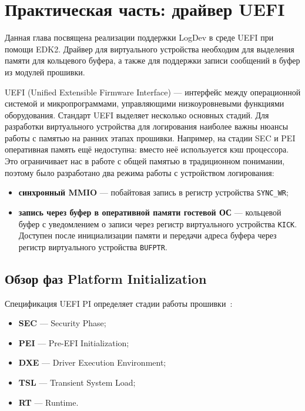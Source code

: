 \section{Практическая часть: драйвер UEFI}
\label{sec:Chapter3} 

Данная глава посвящена реализации поддержки LogDev в среде UEFI при помощи EDK2.
Драйвер для виртуального устройства
необходим для выделения памяти для кольцевого буфера, а также для поддержки записи сообщений в буфер из модулей прошивки.

UEFI (Unified Extensible Firmware Interface) --- интерфейс между операционной системой и микропрограммами, управляющими низкоуровневыми функциями оборудования.
Стандарт UEFI выделяет несколько основных стадий. Для разработки виртуального устройства для логирования наиболее важны нюансы работы с памятью на ранних этапах прошивки. Например, на стадии SEC и PEI оперативная память ещё недоступна: вместо неё используется кэш процессора. Это ограничивает нас в работе с общей памятью в традиционном понимании, поэтому было разработано два режима работы с устройством логирования:
\begin{itemize}
    \item \textbf{синхронный MMIO} --- побайтовая запись в регистр устройства \texttt{SYNC\_WR};
    \item \textbf{запись через буфер в оперативной памяти гостевой ОС} --- кольцевой буфер с
    уведомлением о записи через регистр виртуального устройства \texttt{KICK}. Доступен после инициализации памяти и передачи адреса буфера через регистр виртуального устройства \texttt{BUFPTR}.
\end{itemize}

\subsection{Обзор фаз Platform Initialization}

Спецификация UEFI PI определяет стадии работы прошивки~\cite{uefi_spec}:
\begin{itemize}
    \item \textbf{SEC} --- Security Phase;
    \item \textbf{PEI} --- Pre-EFI Initialization;
    \item \textbf{DXE} --- Driver Execution Environment;
    \item \textbf{TSL} --- Transient System Load;
    \item \textbf{RT} --- Runtime.
\end{itemize}

